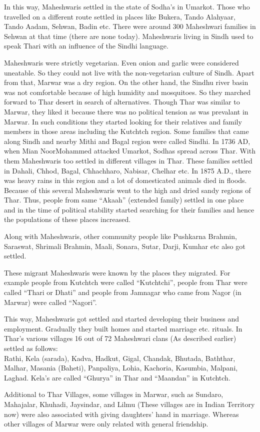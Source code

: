 In this way, Maheshwaris settled in the state of Sodha's in Umarkot. Those who
travelled on a different route settled in places like Bukera, Tando Alahyaar,
Tando Aadam, Sehwan, Badin etc. There were around 300 Maheshwari families in
Sehwan at that time (there are none today). Maheshwaris living in Sindh used to
speak Thari with an influence of the Sindhi language.

Maheshwaris were strictly vegetarian. Even onion and garlic were considered
uneatable. So they could not live with the non-vegetarian culture of Sindh.
Apart from that, Marwar was a dry region. On the other hand, the Sindhu river
basin was not comfortable because of high humidity and mosquitoes. So they
marched forward to Thar desert in search of alternatives. Though Thar was
similar to Marwar, they liked it because there was no political tension as was
prevalant in Marwar. In such conditions they started looking for their
relatives and family members in those areas including the Kutchtch region. Some
families that came along Sindh and nearby Mithi and Bagal region were called
Sindhi. In 1736 AD, when Mian NoorMohammed attacked Umarkot, Sodhas spread
across Thar. With them Maheshwaris too settled in different villages in Thar.
These families settled in Dahali, Chhod, Bagal, Chhachharo, Nabisar, Chelhar
etc. In 1875 A.D., there was heavy rains in this region and a lot of
domesticated animals died in floods. Because of this several Maheshwaris went
to the high and dried sandy regions of Thar. Thus, people from same ``Akaah''
(extended family) settled in one place and in the time of political stability
started searching for their families and hence the populations of these places
increased.

Along with Maheshwaris, other community people like Pushkarna Brahmin,
Saraswat, Shrimali Brahmin, Maali, Sonara, Sutar, Darji, Kumhar etc also got
settled.

These migrant Maheshwaris were known by the places they migrated. For example
people from Kutchtch were called ``Kutchtchi'', people from Thar were called
``Thari or Dhati'' and people from Jamnagar who came from Nagor (in Marwar)
were called ``Nagori''.

This way, Maheshwaris got settled and started developing their business and
employment. Gradually they built homes and started marriage etc. rituals. In
Thar's various villages 16 out of 72 Maheshwari clans (As described earlier)
settled as follows:\\ Rathi, Kela (sarada), Kadva, Hadkut, Gigal, Chandak,
Bhutada, Baththar, Malhar, Masania (Baheti), Panpaliya, Lohia, Kachoria,
Kasumbia, Malpani, Laghad. Kela's are called ``Ghurya'' in Thar and ``Maandan''
in Kutchtch.

Additional to Thar Villages, some villages in Marwar, such as Sundaro,
Mahajalar, Khuhadi, Jaysindar, and Lilmu (These villages are in Indian
Territory now) were also associated with giving daughters' hand in marriage.
Whereas other villages of Marwar were only related with general friendship.
